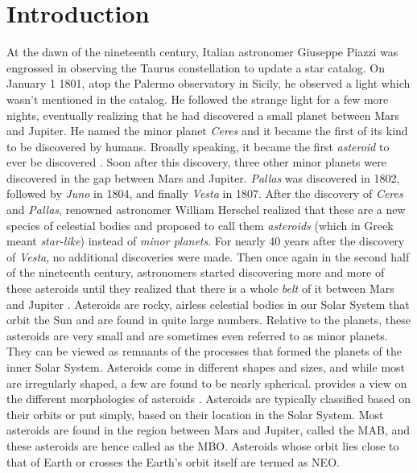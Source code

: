 \chapter{Introduction}
\label{chap:intro}
\graphicspath{{Introduction/Images/}}

At the dawn of the nineteenth century, Italian astronomer Giuseppe Piazzi was engrossed in observing the Taurus constellation to update a star catalog. On January 1 1801, atop the Palermo observatory in Sicily, he observed a light which wasn't mentioned in the catalog. He followed the strange light for a few more nights, eventually realizing that he had discovered a small planet between Mars and Jupiter. He named the minor planet \textit{Ceres} and it became the first of its kind to be discovered by humans. Broadly speaking, it became the first \textit{asteroid} to ever be discovered \parencite{cunningham2016discovery}. Soon after this discovery, three other minor planets were discovered in the gap between Mars and Jupiter. \textit{Pallas} was discovered in 1802, followed by \textit{Juno} in 1804, and finally \textit{Vesta} in 1807. After the discovery of \textit{Ceres} and \textit{Pallas}, renowned astronomer William Herschel realized that these are a new species of celestial bodies and proposed to call them \textit{asteroids} (which in Greek meant \textit{star-like}) instead of \textit{minor planets}. For nearly 40 years after the discovery of \textit{Vesta}, no additional discoveries were made. Then once again in the second half of the nineteenth century, astronomers started discovering more and more of these asteroids until they realized that there is a whole \textit{belt} of it between Mars and Jupiter \parencite{bottke2002asteroids}.
%
\newline\newline
%
Asteroids are rocky, airless celestial bodies in our Solar System that orbit the Sun and are found in quite large numbers. Relative to the planets, these asteroids are very small and are sometimes even referred to as minor planets. They can be viewed as remnants of the processes that formed the planets of the inner Solar System. Asteroids come in different shapes and sizes, and while most are irregularly shaped, a few are found to be nearly spherical.  provides a view on the different morphologies of asteroids \parencite{nasa_asteroids_web}. Asteroids are typically classified based on their orbits or put simply, based on their location in the Solar System. Most asteroids are found in the region between Mars and Jupiter, called the \gls{MAB}, and these asteroids are hence called as the \gls{MBO}. Asteroids whose orbit lies close to that of Earth or crosses the Earth's orbit itself are termed as \gls{NEO}.

